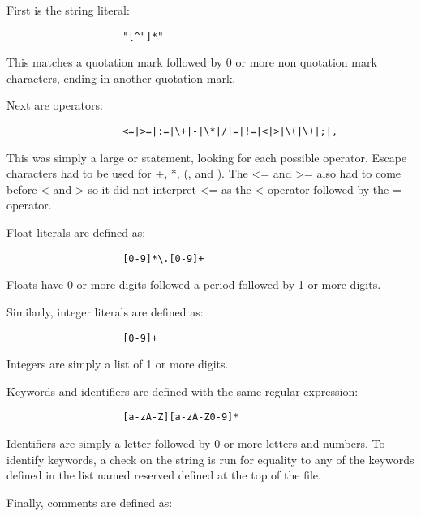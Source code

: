 \documentclass[12pt]{article}
\begin{document}
                First is the string literal:

                \begin{verbatim}
                    "[^"]*"
                \end{verbatim}

                This matches a quotation mark followed by 0 or more non quotation mark characters, ending in another quotation mark.

                Next are operators:

                \begin{verbatim}
                    <=|>=|:=|\+|-|\*|/|=|!=|<|>|\(|\)|;|,
                \end{verbatim}

                This was simply a large or statement, looking for each possible operator. Escape characters had to be used for +, *, (, and ). The <= and >= also had to come before < and > so it did not interpret <= as the < operator followed by the = operator.

                Float literals are defined as:

                \begin{verbatim}
                    [0-9]*\.[0-9]+
                \end{verbatim}

                Floats have 0 or more digits followed a period followed by 1 or more digits.

                Similarly, integer literals are defined as: 

                \begin{verbatim}
                    [0-9]+
                \end{verbatim}

                Integers are simply a list of 1 or more digits.

                Keywords and identifiers are defined with the same regular expression:

                \begin{verbatim}
                    [a-zA-Z][a-zA-Z0-9]*
                \end{verbatim}

                Identifiers are simply a letter followed by 0 or more letters and numbers. To identify keywords, a check on the string is run for equality to any of the keywords defined in the list named reserved defined at the top of the file.

                Finally, comments are defined as:
\end{document}
